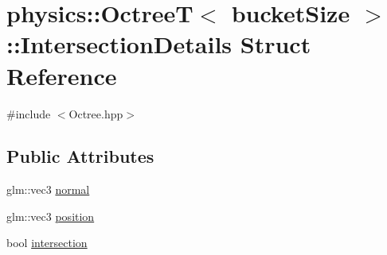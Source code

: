 \hypertarget{structphysics_1_1OctreeT_1_1IntersectionDetails}{\section{physics\-:\-:Octree\-T$<$ bucket\-Size $>$\-:\-:Intersection\-Details Struct Reference}
\label{structphysics_1_1OctreeT_1_1IntersectionDetails}
}


{\ttfamily \#include $<$Octree.\-hpp$>$}

\subsection*{Public Attributes}
\begin{DoxyCompactItemize}
\item 
glm\-::vec3 \hyperlink{structphysics_1_1OctreeT_1_1IntersectionDetails_a87efb768acda70549ef16a20a5a15681}{normal}
\item 
glm\-::vec3 \hyperlink{structphysics_1_1OctreeT_1_1IntersectionDetails_a301cd627e77f95090c2aafc202ca9aeb}{position}
\item 
bool \hyperlink{structphysics_1_1OctreeT_1_1IntersectionDetails_acd7da41845687dadd2004ab3f849952b}{intersection}
\end{DoxyCompactItemize}


